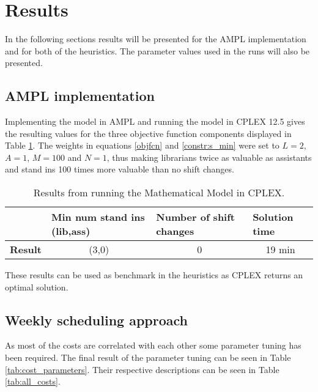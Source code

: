 \section{Results}
In the following sections results will be presented for the AMPL implementation and for both of the heuristics. The parameter values used in the runs will also be presented. 

\subsection{AMPL implementation}

Implementing the model in AMPL and running the model in CPLEX 12.5 gives the resulting values for the three objective function components displayed in Table \ref{tab:CPLEX_res}. The weights in equations \ref{objfcn} and \ref{constr:s_min} were set to $L = 2$, $A = 1$, $M =100$ and $N=1$, thus making librarians twice as valuable as assistants and stand ins 100 times more valuable than no shift changes. 

\begin{table}[!h]
\centering
\label{tab:CPLEX_res}
\caption{Results from running the Mathematical Model in CPLEX.}
\begin{tabular}{|l|p{3cm}|p{3cm}|l|}
\hline
\rowcolor{Gray} & \textbf{Min num stand ins (lib,ass)} & \textbf{Number of shift changes} & \textbf{Solution time} \\ \hline
\cellcolor{Gray} \textbf{Result} & \multicolumn{1}{c|}{(3,0)} & \multicolumn{1}{c|}{0} & \multicolumn{1}{c|}{19 min} \\
\hline
\end{tabular}
\end{table}

These results can be used as benchmark in the heuristics as CPLEX returns an optimal solution. 

\subsection{Weekly scheduling approach}
As most of the costs are correlated with each other some parameter tuning has been required. The final result of the parameter tuning can be seen in Table \ref{tab:cost_parameters}. Their respective descriptions can be seen in Table \ref{tab:all_costs}. 

